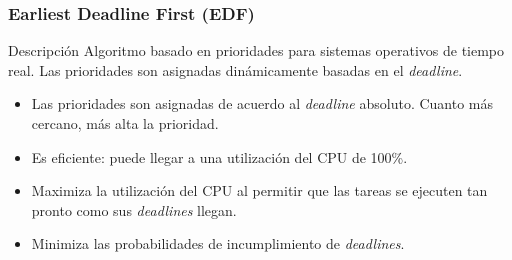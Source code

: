 \begin{frame}
    \frametitle{ Earliest Deadline First (\textbf{EDF}) }

    \begin{exampleblock}{Descripción}
        Algoritmo basado en prioridades para sistemas operativos de tiempo real. Las prioridades son asignadas dinámicamente basadas en el \textit{deadline}.
    \end{exampleblock}

    \begin{itemize}
        \item Las prioridades son asignadas de acuerdo al \textit{deadline} absoluto. Cuanto más cercano, más alta la prioridad.
        \item Es eficiente: puede llegar a una utilización del CPU de 100\%.
        \item Maximiza la utilización del CPU al permitir que las tareas se ejecuten tan pronto como sus \textit{deadlines} llegan.
        \item Minimiza las probabilidades de incumplimiento de \textit{deadlines}.
    \end{itemize}

\end{frame}